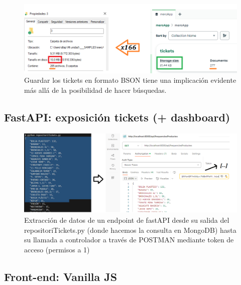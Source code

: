 \documentclass{beamer}
\begin{document}
	
	\begin{frame}
		\begin{figure}
			\centering
			\includegraphics[width=1\linewidth]{imgEspecifiques/disminucioTamanyMongoDB}
			\caption{Guardar los tickets en formato BSON tiene una implicación evidente más allá de la posibilidad de hacer búsquedas.}
			\label{fig:disminuciotamanymongodb}
		\end{figure}
		
	\end{frame}
	
	
		\subsection{FastAPI: exposición tickets (+ dashboard)}
	
		\begin{frame}
			
			\begin{figure}
				\centering
				\includegraphics[width=1\linewidth]{imgEspecifiques/dashboardA}
				\caption{Extracción de datos de un endpoint de fastAPI desde su salida del repositoriTickets.py (donde hacemos la consulta en MongoDB) hasta su llamada a controlador a través de POSTMAN mediante token de acceso (permisos a 1)}
				\label{fig:dashboardA}
			\end{figure}
			
		\end{frame}
	
	
	
		\subsection{Front-end: Vanilla JS}
		
\end{document}
